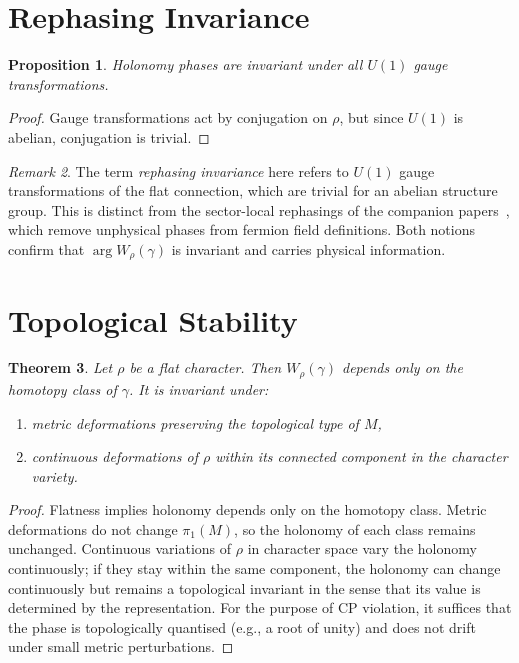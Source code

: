 \documentclass[12pt]{article}
\newtheorem{theorem}{Theorem}
\newtheorem{proposition}[theorem]{Proposition}
\theoremstyle{remark}
\newtheorem{remark}[theorem]{Remark}
\theoremstyle{plain}
\begin{document}
\section{Rephasing Invariance}
\label{prop:rephasing}

\begin{proposition}
Holonomy phases are invariant under all $U(1)$ gauge transformations.
\end{proposition}

\begin{proof}
Gauge transformations act by conjugation on $\rho$,
but since $U(1)$ is abelian, conjugation is trivial.
\end{proof}

\begin{remark}
The term \emph{rephasing invariance} here refers to $U(1)$ gauge
transformations of the flat connection, which are trivial for an abelian
structure group.  This is distinct from the sector-local rephasings
of the companion papers~\cite{Gentry:CKM,Gentry:PMNS}, which remove
unphysical phases from fermion field definitions.  Both notions confirm
that $\arg W_\rho(\gamma)$ is invariant and carries physical information.
\end{remark}

\section{Topological Stability}

\begin{theorem}
Let $\rho$ be a flat character.
Then $W_\rho(\gamma)$ depends only on the homotopy class of $\gamma$.
It is invariant under:
\begin{enumerate}
\item metric deformations preserving the topological type of $M$,
\item continuous deformations of $\rho$ within its connected component
in the character variety.
\end{enumerate}
\end{theorem}

\begin{proof}
Flatness implies holonomy depends only on the homotopy class.
Metric deformations do not change $\pi_1(M)$, so the holonomy of each class
remains unchanged.  Continuous variations of $\rho$ in character space
vary the holonomy continuously; if they stay within the same component,
the holonomy can change continuously but remains a topological invariant
in the sense that its value is determined by the representation.
For the purpose of CP violation, it suffices that the phase is
topologically quantised (e.g., a root of unity) and does not drift
under small metric perturbations.
\end{proof}
\end{document}
